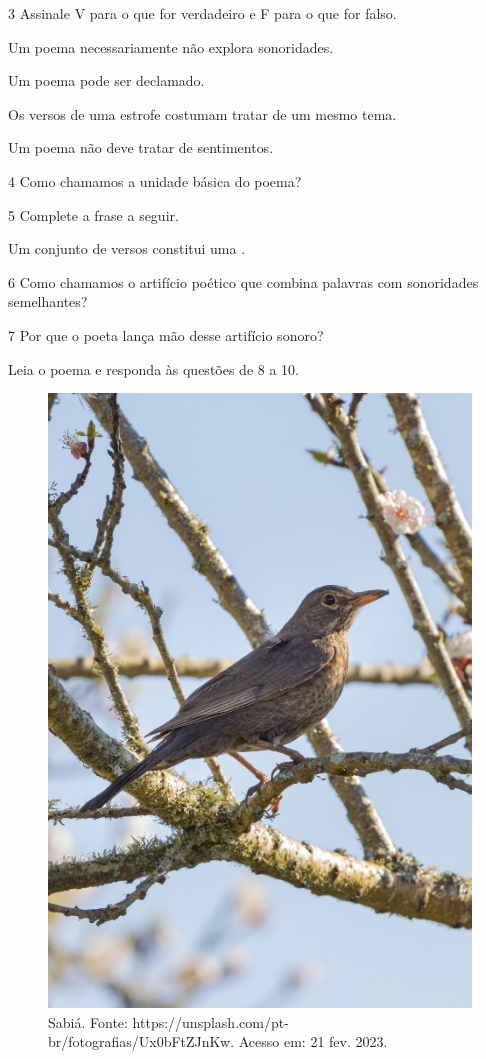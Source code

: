\num{3} Assinale V para o que for verdadeiro e F para o que for falso.

\begin{boxlist}
 Um poema necessariamente não explora sonoridades.

 Um poema pode ser declamado.

 Os versos de uma estrofe costumam tratar de um mesmo tema.

 Um poema não deve tratar de sentimentos.
\end{boxlist}

\num{4} Como chamamos a unidade básica do poema?


\num{5} Complete a frase a seguir.

Um conjunto de versos constitui uma \preencher. 

\num{6} Como chamamos o artifício poético que combina palavras com
sonoridades semelhantes?



\num{7} Por que o poeta lança mão desse artifício sonoro?



Leia o poema e responda às questões de 8 a 10.

\begin{figure}[htpb!]
\includegraphics[width=.5\textwidth]{./imgs/img17.jpg}
\caption{Sabiá. Fonte: https://unsplash.com/pt-br/fotografias/Ux0bFtZJnKw. Acesso em: 21 fev. 2023.}
\end{figure}

